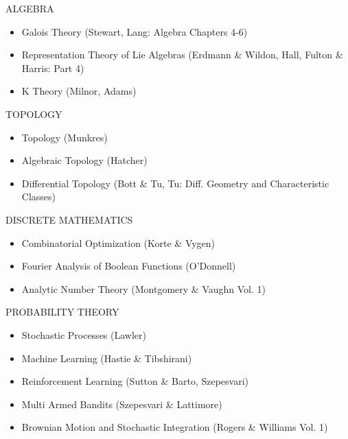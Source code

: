 \documentclass{friggeri-cv}
\begin{document}
\begin{entrylist}

\entries
{ALGEBRA}
{
\begin{itemize}
    \setlength\itemsep{-1em}
    \item Galois Theory (Stewart, Lang: Algebra Chapters 4-6)\\
    \item Representation Theory of Lie Algebras (Erdmann \& Wildon, Hall, Fulton \& Harris: Part 4)\\
    \item K Theory (Milnor, Adams)
\end{itemize}
}


\entries
{TOPOLOGY}
{
\begin{itemize}
    \setlength\itemsep{-1em}
    \item Topology (Munkres)\\
    \item Algebraic Topology (Hatcher)\\
    \item Differential Topology (Bott \& Tu, Tu: Diff. Geometry and Characteristic Classes)
\end{itemize}
}

\entries
{DISCRETE MATHEMATICS}
{
\begin{itemize}
    \setlength\itemsep{-1em}
    \item Combinatorial Optimization (Korte \& Vygen)\\
    \item Fourier Analysis of Boolean Functions (O'Donnell)\\
    \item Analytic Number Theory (Montgomery \& Vaughn Vol. 1)
\end{itemize}
}

\entries
{PROBABILITY THEORY}
{
\begin{itemize}
    \setlength\itemsep{-1em}
    \item Stochastic Processes (Lawler)\\
    \item Machine Learning (Hastie \& Tibshirani)\\
    \item Reinforcement Learning (Sutton \& Barto, Szepesvari)\\
    \item Multi Armed Bandits (Szepesvari \& Lattimore)\\
    \item Brownian Motion and Stochastic Integration (Rogers \& Williams Vol. 1)
\end{itemize}
}


\end{entrylist}
\end{document}
